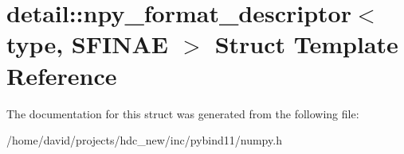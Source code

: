 \hypertarget{structdetail_1_1npy__format__descriptor}{}\section{detail\+:\+:npy\+\_\+format\+\_\+descriptor$<$ type, S\+F\+I\+N\+AE $>$ Struct Template Reference}
\label{structdetail_1_1npy__format__descriptor}


The documentation for this struct was generated from the following file\+:\begin{DoxyCompactItemize}
\item 
/home/david/projects/hdc\+\_\+new/inc/pybind11/numpy.\+h\end{DoxyCompactItemize}
